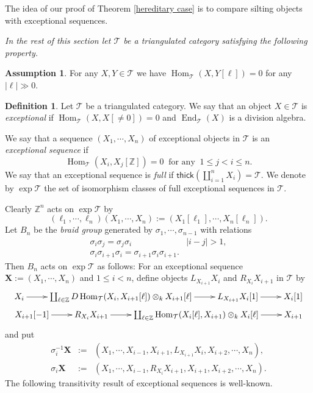 \documentclass[a4paper,reqno]{amsart}
\theoremstyle{definition}
\newtheorem{definition}[theorem]{Definition}
\newcommand{\TT}{{\mathcal T}}
\newcommand{\Z}{\mathbb{Z}}
\newcommand{\thick}{\mathsf{thick}}
\newcommand{\Hom}{\operatorname{Hom}\nolimits}
\newtheorem{assumption}[theorem]{Assumption}
\newcommand{\exc}{\operatorname{exp}\nolimits}
\newcommand{\End}{\operatorname{End}\nolimits}
\begin{document}
The idea of our proof of Theorem \ref{hereditary case} is to compare silting objects
with exceptional sequences.

\emph{In the rest of this section let $\TT$ be a triangulated category satisfying
the following property.}

\begin{assumption}\label{total Hom-finite}
For any $X,Y\in\TT$ we have $\Hom_{\TT}(X,Y[\ell])=0$ for any $|\ell|\gg0$.
\end{assumption}

\begin{definition}
Let $\TT$ be a triangulated category.
We say that an object $X\in\TT$ is \emph{exceptional} if
$\Hom_{\TT}(X,X[\neq0])=0$ and $\End_{\TT}(X)$ is a division algebra. 

We say that a sequence $(X_1,\cdots,X_n)$ of exceptional objects in $\TT$
is an \emph{exceptional sequence} if
\[\Hom_{\TT}(X_i,X_j[\Z])=0\ \mbox{ for any }\ 1\le j<i\le n.\]
We say that an exceptional sequence is \emph{full} if
$\thick(\coprod_{i=1}^nX_i)=\TT$.
We denote by $\exc\TT$ the set of isomorphism classes of full exceptional sequences in $\TT$.
\end{definition}

Clearly $\Z^n$ acts on $\exc\TT$ by
\[(\ell_1,\cdots,\ell_n)(X_1,\cdots,X_n):=(X_1[\ell_1],\cdots,X_n[\ell_n]).\]
Let $B_n$ be the \emph{braid group} generated by $\sigma_1,\cdots,\sigma_{n-1}$
with relations
\begin{eqnarray*}
\sigma_i\sigma_j=\sigma_j\sigma_i&|i-j|>1,\\
\sigma_i\sigma_{i+1}\sigma_i=\sigma_{i+1}\sigma_i\sigma_{i+1}.&
\end{eqnarray*} 
Then $B_n$ acts on $\exc\TT$ \cite{GR} as follows:
For an exceptional sequence ${\mathbf X}:=(X_1,\cdots,X_n)$ and $1\le i<n$,
define objects $L_{X_{i+1}}X_i$ and $R_{X_i}X_{i+1}$ in $\TT$ by
\begin{eqnarray*}
\xymatrix{
X_i\ar[r]&\coprod_{\ell\in\Z}D\Hom_{\TT}(X_i,X_{i+1}[\ell])\otimes_kX_{i+1}[\ell]
\ar[r]&L_{X_{i+1}}X_i[1]\ar[r]&X_i[1]
}\\
\xymatrix{
X_{i+1}[-1]\ar[r]& R_{X_i}X_{i+1}\ar[r]&\coprod_{\ell\in\Z}\Hom_{\TT}(X_{i}[\ell],X_{i+1})\otimes_kX_i[\ell]\ar[r]&X_{i+1}
}\end{eqnarray*}
and put
\begin{eqnarray*}
\sigma_i^{-1}{\mathbf X}&:=&(X_1,\cdots,X_{i-1},X_{i+1},L_{X_{i+1}}X_i,X_{i+2},\cdots,X_n),\\
\sigma_i{\mathbf X}&:=&(X_1,\cdots,X_{i-1},R_{X_i}X_{i+1},X_{i+1},X_{i+2},\cdots,X_n).
\end{eqnarray*}
The following transitivity result of exceptional sequences is well-known.
\end{document}
